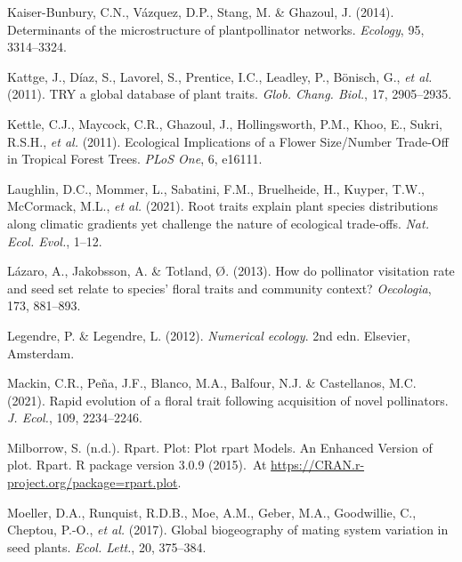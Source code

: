 \documentclass[
  12pt,
  a4paper,
]{article}
\newlength{\cslhangindent}
\newlength{\cslentryspacingunit} %
\newenvironment{CSLReferences}[2] %
 {%
  \setlength{\parindent}{0pt}
  \ifodd #1
  \let\oldpar\par
  \def\par{\hangindent=\cslhangindent\oldpar}
  \fi
  \setlength{\parskip}{#2\cslentryspacingunit}
 }%
 {}
\begin{document}
\begin{CSLReferences}{1}{0}
\leavevmode{}%
Kaiser-Bunbury, C.N., Vázquez, D.P., Stang, M. \& Ghazoul, J. (2014). Determinants of the microstructure of plant\textendash pollinator networks. \emph{Ecology}, 95, 3314--3324.

\leavevmode{}%
Kattge, J., Díaz, S., Lavorel, S., Prentice, I.C., Leadley, P., Bönisch, G., \emph{et al.} (2011). {TRY} \textendash{} a global database of plant traits. \emph{Glob. Chang. Biol.}, 17, 2905--2935.

\leavevmode{}%
Kettle, C.J., Maycock, C.R., Ghazoul, J., Hollingsworth, P.M., Khoo, E., Sukri, R.S.H., \emph{et al.} (2011). Ecological {Implications} of a {Flower Size}/{Number Trade}-{Off} in {Tropical Forest Trees}. \emph{PLoS One}, 6, e16111.

\leavevmode{}%
Laughlin, D.C., Mommer, L., Sabatini, F.M., Bruelheide, H., Kuyper, T.W., McCormack, M.L., \emph{et al.} (2021). Root traits explain plant species distributions along climatic gradients yet challenge the nature of ecological trade-offs. \emph{Nat. Ecol. Evol.}, 1--12.

\leavevmode{}%
Lázaro, A., Jakobsson, A. \& Totland, Ø. (2013). How do pollinator visitation rate and seed set relate to species' floral traits and community context? \emph{Oecologia}, 173, 881--893.

\leavevmode{}%
Legendre, P. \& Legendre, L. (2012). \emph{Numerical ecology}. {2nd edn}. {Elsevier, Amsterdam}.

\leavevmode{}%
Mackin, C.R., Peña, J.F., Blanco, M.A., Balfour, N.J. \& Castellanos, M.C. (2021). Rapid evolution of a floral trait following acquisition of novel pollinators. \emph{J. Ecol.}, 109, 2234--2246.

\leavevmode{}%
Milborrow, S. (n.d.). Rpart. Plot: {Plot} rpart {Models}. {An Enhanced Version} of plot. Rpart. R package version 3.0.9 (2015).~At \href{https://CRAN.R-project.org/package=rpart.plot}{https://CRAN.r-project.org/package=rpart.plot}.

\leavevmode{}%
Moeller, D.A., Runquist, R.D.B., Moe, A.M., Geber, M.A., Goodwillie, C., Cheptou, P.-O., \emph{et al.} (2017). Global biogeography of mating system variation in seed plants. \emph{Ecol. Lett.}, 20, 375--384.


\end{CSLReferences}
\end{document}
